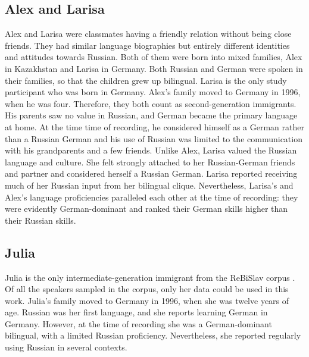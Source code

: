 \subsection{Alex and Larisa}
Alex and Larisa were classmates having a friendly relation without being close friends. They had similar language biographies but entirely different identities and attitudes towards Russian. Both of them were born into mixed families, Alex in Kazakhstan and Larisa in Germany. Both Russian and German were spoken in their families, so that the children grew up bilingual. Larisa is the only study participant who was born in Germany. Alex's family moved to Germany in 1996, when he was four. Therefore, they both count as second-generation immigrants. His parents saw no value in Russian, and German became the primary language at home. At the time time of recording, he considered himself as a German rather than a Russian German and his use of Russian was limited to the communication with his grandparents and a few friends. Unlike Alex, Larisa valued the Russian language and culture. She felt strongly attached to her Russian-German friends and partner and considered herself a Russian German. Larisa reported receiving much of her Russian input from her bilingual clique. Nevertheless, Larisa's and Alex's language proficiencies paralleled each other at the time of recording: they were evidently German-dominant and ranked their German skills higher than their Russian skills.

\subsection{Julia}
Julia is the only intermediate-generation immigrant from the ReBiSlav corpus \citep{rebislav}. Of all the speakers sampled in the corpus, only her data could be used in this work. Julia's family moved to Germany in 1996, when she was twelve years of age. Russian was her first language, and she reports learning German in Germany. However, at the time of recording she was a German-dominant bilingual, with a limited Russian proficiency. Nevertheless, she reported regularly using Russian in several contexts.

